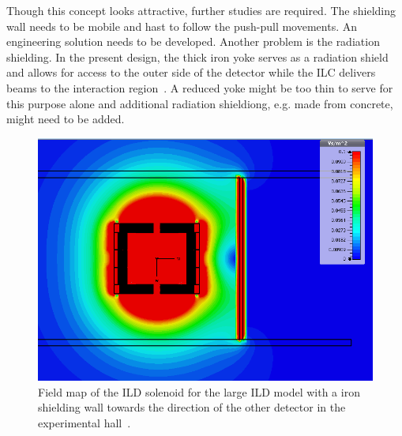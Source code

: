 Though this concept looks attractive, further studies are required. The shielding wall needs to be mobile and hast to follow the push-pull movements. An engineering solution needs to be developed. Another problem is the radiation shielding. In the present design, the thick iron yoke serves as a radiation shield and allows for access to the outer side of the detector while the ILC delivers beams to the interaction region~\cite{ild:bib:Radiation_Hall}. A reduced yoke might be too thin to serve for this purpose alone and additional radiation shieldiong, e.g. made from concrete, might need to be added. 
\begin{figure}[h!]
    \centering
    \includegraphics[width=0.8\hsize]{Integration/fig/magnet_wall.png}
    \caption{Field map of the ILD solenoid for the large ILD model with a iron shielding wall towards the direction of the other detector in the experimental hall~\cite{ild:bib:Magnet_Simulations}.}
    \label{ILD:fig:magnet_wall}
\end{figure}


